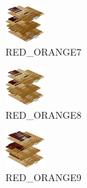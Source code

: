 \hspace{0.1cm}
\begin{minipage}[b]{0.15\linewidth}
\begin{figure}[H]                                                          
  \centering                                                             
  \begin{adjustbox}{width=1.5cm,center}                                   
  \includegraphics[width=1.5cm]{src/colorspace_colourflow/flows/colourflow_39-45.png}%
  \end{adjustbox}                                                        
\caption*{RED\_ORANGE7}                                           
\end{figure}                                                               
\end{minipage}
\hspace{0.1cm}
\begin{minipage}[b]{0.15\linewidth}
\begin{figure}[H]                                                          
  \centering                                                             
  \begin{adjustbox}{width=1.5cm,center}                                   
  \includegraphics[width=1.5cm]{src/colorspace_colourflow/flows/colourflow_40-45.png}%
  \end{adjustbox}                                                        
\caption*{RED\_ORANGE8}                                           
\end{figure}                                                               
\end{minipage}
\hspace{0.1cm}
\begin{minipage}[b]{0.15\linewidth}
\begin{figure}[H]                                                          
  \centering                                                             
  \begin{adjustbox}{width=1.5cm,center}                                   
  \includegraphics[width=1.5cm]{src/colorspace_colourflow/flows/colourflow_41-45.png}%
  \end{adjustbox}                                                        
\caption*{RED\_ORANGE9}                                           
\end{figure}                                                               
\end{minipage}
